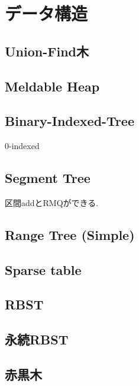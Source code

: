 \section{データ構造}
\subsection{Union-Find木}


\subsection{Meldable Heap}


\subsection{Binary-Indexed-Tree}
0-indexed

\subsection{Segment Tree}
区間addとRMQができる.


\subsection{Range Tree (Simple)}


\subsection{Sparse table}


\subsection{RBST}


\subsection{永続RBST}


\subsection{赤黒木}

